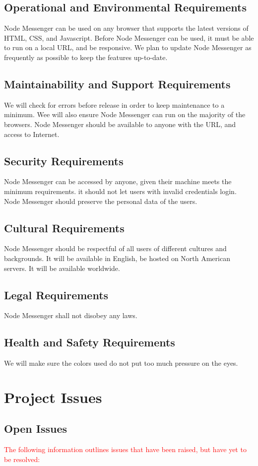 \documentclass[12pt, titlepage]{article}
\begin{document}
    	\subsection{Operational and Environmental Requirements}
		Node Messenger can be used on any browser that supports the latest versions of HTML, CSS, and Javascript. Before Node Messenger can be used, it must be able to run on a local URL, and be responsive. We plan to update Node Messenger as frequently as possible to keep the features up-to-date.
    	\subsection{Maintainability and Support Requirements}
		We will check for errors before release in order to keep maintenance to a minimum. Wee will also ensure Node Messenger can run on the majority of the browsers. Node Messenger should be available to anyone with the URL, and access to Internet.
    	\subsection{Security Requirements}
		Node Messenger can be accessed by anyone, given their machine meets the minimum requirements. it should not let users with invalid credentials login. Node Messenger should preserve the personal data of the users.
    	\subsection{Cultural Requirements}
		Node Messenger should be respectful of all users of different cultures and backgrounds. It will be available in English, be hosted on North American servers. It will be available worldwide. 
	    \subsection{Legal Requirements}
		Node Messenger shall not disobey any laws.
    	\subsection{Health and Safety Requirements}
		We will make sure the colors used do not put too much pressure on the eyes. 
	
	\newpage
    \section{Project Issues}

    	\subsection{Open Issues}
    	\textcolor{red}{The following information outlines issues that have been raised, but have yet to be resolved:\\}
    	\begin{itemize}
    	\end{itemize}
\end{document}
